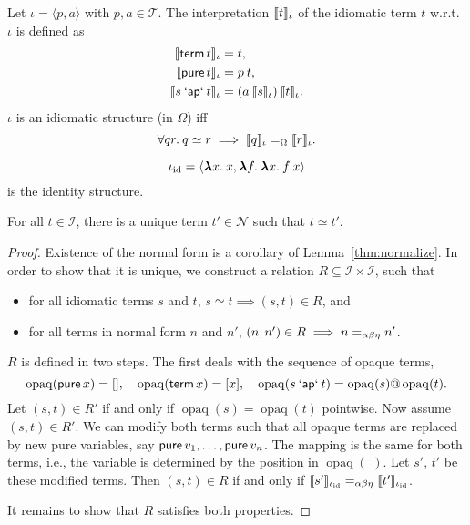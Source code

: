 \begin{definition}\label{def:iterm-interp}
Let $\iota = \langle p, a \rangle$ with $p,a \in \mathcal{T}$.
The interpretation $\llbracket t \rrbracket_\iota$ of the idiomatic term $t$ w.r.t. $\iota$
is defined as
\begin{align}
	\llbracket \operatorname{\mathsf{term}} t \rrbracket_\iota &= t, \\
	\llbracket \operatorname{\mathsf{pure}} t \rrbracket_\iota &= p \> t, \\
	\llbracket s \mathbin{\mathsf{`ap`}} t \rrbracket_\iota &= (a \> \llbracket s \rrbracket_\iota) \> \llbracket t \rrbracket_\iota.
\end{align}
$\iota$ is an idiomatic structure (in $\Omega$) iff
\begin{equation}
	\forall q r.\>q \simeq r \implies \llbracket q \rrbracket_\iota =_\Omega \llbracket r \rrbracket_\iota.
\end{equation}
\end{definition}

\begin{definition}\label{def:id-structure}
\begin{equation}
	\iota_\mathrm{id} = \langle {\boldsymbol\lambda} x.\>x, {\boldsymbol\lambda} f.\>{\boldsymbol\lambda} x.\>f \> x \rangle
\end{equation}
is the identity structure.
\end{definition}


\begin{lemma}\label{thm:normal-form}
For all $t \in \mathcal{I}$, there is a unique term $t' \in \mathcal{N}$ such
that $t \simeq t'$.
\end{lemma}
\begin{proof}
Existence of the normal form is a corollary of Lemma~\ref{thm:normalize}.
In order to show that it is unique, we construct a relation
$R \subseteq \mathcal{I}\times\mathcal{I}$, such that
\begin{itemize}
\item for all idiomatic terms $s$ and $t$, $s \simeq t \implies (s,t) \in R$, and
\item for all terms in normal form $n$ and $n'$, $(n,n') \in R \implies n =_{\alpha\beta\eta} n'$.
\end{itemize}
$R$ is defined in two steps.
The first deals with the sequence of opaque terms,
\[
	\operatorname{opaq}(\operatorname{\mathsf{pure}} x) = [], \quad
	\operatorname{opaq}(\operatorname{\mathsf{term}} x) = [x], \quad
	\operatorname{opaq}(s \mathbin{\mathsf{`ap`}} t) = \operatorname{opaq}(s) @ \operatorname{opaq}(t).
\]
Let $(s,t) \in R'$ if and only if $\operatorname{opaq}(s) = \operatorname{opaq}(t)$
pointwise.
Now assume $(s,t) \in R'$.
We can modify both terms such that all opaque terms are replaced by new pure
variables, say $\operatorname{\mathsf{pure}} v_1,\dots,\operatorname{\mathsf{pure}} v_n$.
The mapping is the same for both terms, i.e., the variable is determined by
the position in $\operatorname{opaq}(\_)$.
Let $s'$, $t'$ be these modified terms.
Then $(s,t) \in R$ if and only if
$\llbracket s' \rrbracket_{\iota_\mathrm{id}} =_{\alpha\beta\eta} \llbracket t' \rrbracket_{\iota_\mathrm{id}}$.

It remains to show that $R$ satisfies both properties.
\todo
\end{proof}

